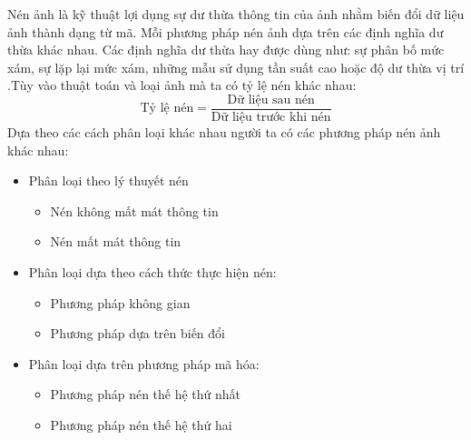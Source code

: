 \documentclass[12pt,oneside,a4]{report}
\begin{document}
Nén ảnh là kỹ thuật lợi dụng sự dư thừa thông tin của ảnh nhằm biến đổi dữ liệu ảnh thành dạng từ mã. Mỗi phương pháp nén ảnh dựa trên các định nghĩa dư thừa khác nhau. Các định nghĩa dư thừa hay được dùng như: sự phân bố mức xám, sự lặp lại mức xám, những mẫu sử dụng tần suất cao hoặc độ dư thừa vị trí .Tùy vào thuật toán và loại ảnh mà ta có tỷ lệ nén khác nhau: 
\begin{equation}
\textrm{Tỷ lệ nén} =\dfrac{\textrm{Dữ liệu sau nén}}{\textrm{Dữ liệu trước khi nén}}
\end{equation}
Dựa theo các cách phân loại khác nhau người ta có các phương pháp nén ảnh khác nhau:
\begin{itemize}
\item Phân loại theo lý thuyết nén
\begin{itemize}
\item Nén không mất mát thông tin
\item Nén mất mát thông tin
\end{itemize}
\item Phân loại dựa theo cách thức thực hiện nén: 
\begin{itemize}
\item Phương pháp không gian
\item Phương pháp dựa trên  biến đổi
\end{itemize}
\item Phân loại dựa trên phương pháp mã hóa:
\begin{itemize}
\item Phương pháp nén thế hệ thứ nhất
\item Phương pháp nén thế hệ thứ hai
\end{itemize}
\end{itemize}
%
\end{document}
